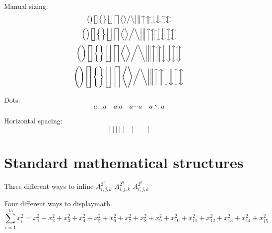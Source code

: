 \documentclass[12pt,a4paper,onecolumn]{article}
\begin{document}
Manual sizing:
\begin{equation}
\big( \big) \big[ \big] \big\{ \big\} \big\lfloor \big\rfloor \big\lceil \big\rceil \big\langle \big\rangle 
\big/ \big\backslash \big| \big\| \big\uparrow \big\Uparrow \big\downarrow \big\Downarrow \big\updownarrow \big\Updownarrow
\end{equation}
\begin{equation}
\Big( \Big) \Big[ \Big] \Big\{ \Big\} \Big\lfloor \Big\rfloor \Big\lceil \Big\rceil \Big\langle \Big\rangle 
\Big/ \Big\backslash \Big| \Big\| \Big\uparrow \Big\Uparrow \Big\downarrow \Big\Downarrow \Big\updownarrow \Big\Updownarrow
\end{equation}
\begin{equation}
\bigg( \bigg) \bigg[ \bigg] \bigg\{ \bigg\} \bigg\lfloor \bigg\rfloor \bigg\lceil \bigg\rceil \bigg\langle \bigg\rangle 
\bigg/ \bigg\backslash \bigg| \bigg\| \bigg\uparrow \bigg\Uparrow \bigg\downarrow \bigg\Downarrow \bigg\updownarrow \bigg\Updownarrow
\end{equation}
\begin{equation}
\Bigg( \Bigg) \Bigg[ \Bigg] \Bigg\{ \Bigg\} \Bigg\lfloor \Bigg\rfloor \Bigg\lceil \Bigg\rceil \Bigg\langle \Bigg\rangle 
\bigg/ \bigg\backslash \bigg| \bigg\| \bigg\uparrow \bigg\Uparrow \bigg\downarrow \bigg\Downarrow \bigg\updownarrow \bigg\Updownarrow
\end{equation}

Dots:
\begin{equation}
a \ldots a \quad a \vdots a \quad  a \cdots a \quad  a \ddots a
\end{equation}

Horizontal spacing:
\begin{equation}
|~|\,|\:|\;|\quad | \qquad |
\end{equation}

\section{Standard mathematical structures}

Three different ways to inline \begin{math}A_{i,j,k}^{2^n}\end{math} \(A_{i,j,k}^{2^n}\) $A_{i,j,k}^{2^n}$

Four different ways to displaymath.
\setcounter{equation}{99}
\begin{equation}\label{equation}
\sum_{i=1}^{15} x_i^2 = x_1^2 + x_2^2 + x_3^2 + x_4^2 + x_5^2 + x_6^2 + x_7^2 + x_8^2 + x_9^2 + x_{10}^2 + x_{11}^2 + x_{12}^2 + x_{13}^2 + x_{14}^2 + x_{15}^2 
\end{equation}
\end{document}
